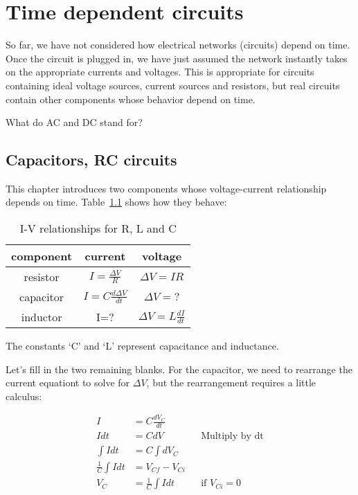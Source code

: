 \chapter{Time dependent circuits}
So far, we have not considered how electrical networks (circuits) depend on time. Once the circuit is plugged in, we have just assumed the network instantly takes on  the appropriate currents and voltages. This is appropriate for circuits containing ideal voltage sources, current sources and resistors, but real circuits contain other components whose behavior depend on time.\\

\begin{alevel}
What do AC and DC stand for?
\end{alevel}

\section{Capacitors, RC circuits}
This chapter introduces two components whose voltage-current relationship depends on time. Table~\ref{T:6RLC} shows how they behave:

\begin{table}[H]
\begin{center}
\renewcommand{\arraystretch}{1.5}
\begin{tabular}{|c|c|c|} \hline
component	& current		&	voltage	\\ \hline
resistor	&$I=\frac{\Delta V}{R}$	&$\Delta V=IR$	\\ \hline
capacitor	&$I=C\frac{d\Delta V}{dt}$	&$\Delta V=?$	\\ \hline
inductor	&I=?			&$\Delta V=L\frac{dI}{dt}$	\\ \hline
\end{tabular}
\caption{I-V relationships for R, L and C}
\label{T:6RLC}
\end{center}
\end{table}

The constants `C' and `L' represent capacitance and inductance.\par

Let's fill in the two remaining blanks. For the capacitor, we need to rearrange the current equationt to solve for $\Delta V$, but the rearrangement requires a little calculus:

\begin{align*}
I&=C\frac{dV_C}{dt}\\
Idt &= CdV &&\text{Multiply by dt}\\
\int{Idt} &= C \int dV_C\\
\frac{1}{C} \int Idt &= V_{Cf}-V_{Ci}\\
V_C&=\frac{1}{C} \int{Idt} &&\text{if $V_{Ci}=0$}
\end{align*} 


